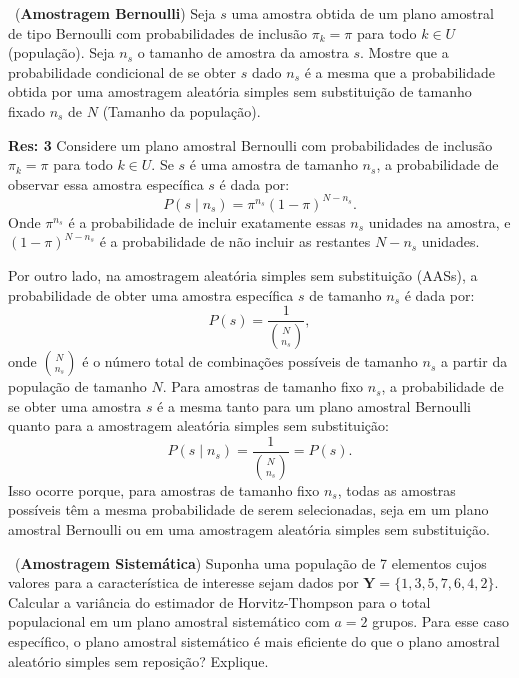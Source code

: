\documentclass[a4paper,11pt,oneside,twocolumn]{Config/milktest}
\begin{document}
	
	\medskip 
	\question~({\bf Amostragem Bernoulli}) Seja $s$ uma amostra obtida de um plano amostral de tipo Bernoulli com probabilidades de inclusão $\pi_k = \pi$ para todo $k \in U$ (população). Seja $n_s$ o tamanho de amostra da amostra $s.$ Mostre que a probabilidade condicional de se obter $s$ dado $n_s$ é a mesma que a probabilidade obtida por uma amostragem aleatória simples sem substituição de tamanho fixado $n_s$ de $N$ (Tamanho da população). 
	
	\medskip
	{\scriptsize  {\bf Res: 3}
		Considere um plano amostral Bernoulli com probabilidades de inclusão \( \pi_k = \pi \) para todo \( k \in U \). Se \( s \) é uma amostra de tamanho \( n_s \), a probabilidade de observar essa amostra específica \( s \) é dada por: 
		\[
		P(s \mid n_s) = \pi^{n_s} (1 - \pi)^{N - n_s}.
		\] Onde \( \pi^{n_s} \) é a probabilidade de incluir exatamente essas \( n_s \) unidades na amostra, e \( (1 - \pi)^{N - n_s} \) é a probabilidade de não incluir as restantes \( N - n_s \) unidades.
		
		Por outro lado, na amostragem aleatória simples sem substituição (AASs), a probabilidade de obter uma amostra específica \( s \) de tamanho \( n_s \) é dada por:
		\[
		P(s) = \frac{1}{\binom{N}{n_s}},
		\] 
		onde \( \binom{N}{n_s} \) é o número total de combinações possíveis de tamanho \( n_s \) a partir da população de tamanho \( N \). 
		Para amostras de tamanho fixo \( n_s \), a probabilidade de se obter uma amostra \( s \) é a mesma tanto para um plano amostral Bernoulli quanto para a amostragem aleatória simples sem substituição: 
		\[
		P(s \mid n_s) = \frac{1}{\binom{N}{n_s}} = P(s).
		\] Isso ocorre porque, para amostras de tamanho fixo \( n_s \), todas as amostras possíveis têm a mesma probabilidade de serem selecionadas, seja em um plano amostral Bernoulli ou em uma amostragem aleatória simples sem substituição.
	}
	
	
	\medskip
	\question~({\bf Amostragem Sistemática}) Suponha uma população de 7 elementos cujos valores para a característica de interesse sejam dados por
	$\mathbf{Y} = \{1, 3, 5, 7, 6, 4, 2\}.$ Calcular a variância do estimador de Horvitz-Thompson para o total populacional em um plano amostral sistemático com $a = 2$ grupos. Para esse caso específico, o plano amostral sistemático é mais eficiente do que o plano amostral aleatório simples sem reposição? Explique.
	
\end{document}
